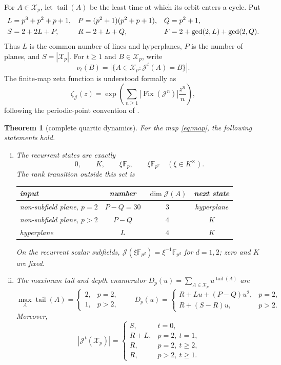 \documentclass[a4paper,10pt]{amsart}
\newtheorem{theorem}{Theorem}
\theoremstyle{remark}
\newcommand{\F}{\mathbb F}
\newcommand{\K}{K}
\newcommand{\X}{\mathcal X}
\newcommand{\J}{\mathcal J}
\newcommand{\Fix}{\operatorname{Fix}}
\newcommand{\tail}{\operatorname{tail}}
\begin{document}
For $A\in\X_p$, let $\tail(A)$ be the least time at which its orbit enters a
cycle.  Put
\begin{align}\label{eq:constants}
 L&=p^3+p^2+p+1, &
 P&=(p^2+1)(p^2+p+1), & Q&=p^2+1,\\
 S&=2+2L+P, & R&=2+L+Q, &
 F&=2+\gcd(2,L)+\gcd(2,Q). \notag
\end{align}
Thus $L$ is the common number of lines and hyperplanes, $P$ is the number
of planes, and $S=|\X_p|$.
For $t\geq1$ and $B\in\X_p$, write
\[
 \nu_t(B)=|\{A\in\X_p:\J^t(A)=B\}|.
\]
The finite-map zeta function is understood formally as
\[
 \zeta_{\J}(z)=\exp\!\left(\sum_{n\geq1}
          |\Fix(\J^n)|\frac{z^n}{n}\right),
\]
following the periodic-point convention of \citet{ArtinMazur1965}.

\begin{theorem}[complete quartic dynamics]\label{thm:main}
For the map \eqref{eq:map}, the following statements hold.
\begin{enumerate}[(i)]
\item The recurrent states are exactly
\begin{equation}\label{eq:recurrent}
 0,\qquad \K,\qquad \xi\F_p,
 \qquad \xi\F_{p^2}\quad(\xi\in\K^\times).
\end{equation}
The rank transition outside this set is
\begin{center}
\begin{tabular}{lccc}
\toprule
input & number & $\dim\J(A)$ & next state \\
\midrule
non-subfield plane, $p=2$ & $P-Q=30$ & $3$ & hyperplane \\
non-subfield plane, $p>2$ & $P-Q$ & $4$ & $\K$ \\
hyperplane & $L$ & $4$ & $\K$ \\
\bottomrule
\end{tabular}
\end{center}
On the recurrent scalar subfields,
$\J(\xi\F_{p^d})=\xi^{-1}\F_{p^d}$ for $d=1,2$; zero and $\K$ are fixed.

\item The maximum tail and depth enumerator
$D_p(u)=\sum_{A\in\X_p}u^{\tail(A)}$ are
\begin{equation}\label{eq:depth}
 \max_A\tail(A)=
 \begin{cases}2,&p=2,\\1,&p>2,\end{cases}
 \qquad
 D_p(u)=
 \begin{cases}
 R+Lu+(P-Q)u^2,&p=2,\\
 R+(S-R)u,&p>2.
 \end{cases}
\end{equation}
Moreover,
\begin{equation}\label{eq:image-stabilization}
 |\J^t(\X_p)|=
 \begin{cases}
 S,&t=0,\\
 R+L,&p=2,\ t=1,\\
 R,&p=2,\ t\geq2,\\
 R,&p>2,\ t\geq1.
 \end{cases}
\end{equation}


\end{enumerate}
\end{theorem}
\end{document}
